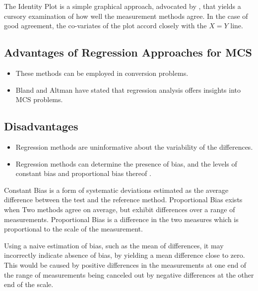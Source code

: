 \documentclass[12pt, a4paper]{report}
\theoremstyle{plain}
\theoremstyle{definition}
\theoremstyle{remark}
\begin{document}
The Identity Plot is a simple graphical approach, advocated by \citet{BA86}, that yields a cursory examination of how well the measurement methods agree. In the case of good agreement, the co-variates of the plot accord closely with the $X=Y$ line.
	
	
	\subsection{Advantages of Regression Approaches for MCS}
	\begin{itemize}
		\item These methods can be employed in conversion problems.
		\item Bland and Altman have stated that regression analysis offers insights into MCS problems.
	\end{itemize}
	\subsection{Disadvantages}
	\begin{itemize}
		\item Regression methods are uninformative about the variability of the differences.
	\end{itemize}
	
	\begin{itemize}\item
		Regression methods can determine the presence of bias, and the levels of constant bias and proportional bias thereof \cite{ludbrook97,ludbrook02}.
	\end{itemize}

Constant Bias is a form of systematic deviations estimated as the average difference between the test and the reference method. Proportional Bias exists when Two methods agree on average, but exhibit differences over a range of measurements. Proportional Bias is a difference in the two measures which is proportional to the scale of the measurement. 
	
	Using a naive estimation of bias, such as the mean of differences, it may incorrectly indicate absence of bias, by yielding a mean difference close to zero. This would be caused by positive differences in the measurements at one end of the range of measurements being canceled out by negative differences at the other end of the scale.
	
	
	
	\newpage
	
\end{document}
